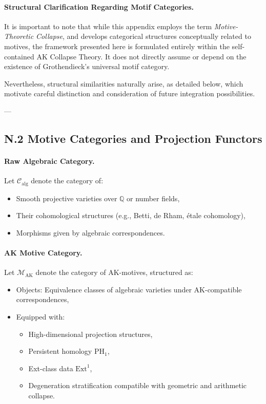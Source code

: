 \documentclass[11pt]{article}
\begin{document}
\paragraph{Structural Clarification Regarding Motif Categories.}

It is important to note that while this appendix employs the term \textit{Motive-Theoretic Collapse}, and develops categorical structures conceptually related to motives, the framework presented here is formulated entirely within the self-contained AK Collapse Theory. It does not directly assume or depend on the existence of Grothendieck's universal motif category.

Nevertheless, structural similarities naturally arise, as detailed below, which motivate careful distinction and consideration of future integration possibilities.

---

\subsection*{N.2 Motive Categories and Projection Functors}

\paragraph{Raw Algebraic Category.}
Let \( \mathcal{C}_{\mathrm{alg}} \) denote the category of:
\begin{itemize}
  \item Smooth projective varieties over \( \mathbb{Q} \) or number fields,
  \item Their cohomological structures (e.g., Betti, de Rham, étale cohomology),
  \item Morphisms given by algebraic correspondences.
\end{itemize}

\paragraph{AK Motive Category.}
Let \( \mathcal{M}_{\mathrm{AK}} \) denote the category of AK-motives, structured as:
\begin{itemize}
  \item Objects: Equivalence classes of algebraic varieties under AK-compatible correspondences,
  \item Equipped with:
  \begin{itemize}
    \item High-dimensional projection structures,
    \item Persistent homology \( \mathrm{PH}_1 \),
    \item Ext-class data \( \mathrm{Ext}^1 \),
    \item Degeneration stratification compatible with geometric and arithmetic collapse.
  \end{itemize}
\end{itemize}
\end{document}
